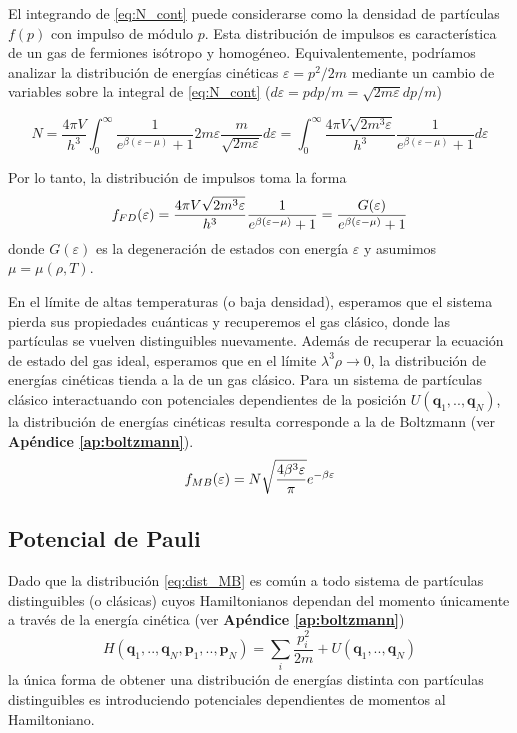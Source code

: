 El integrando de \eqref{eq:N_cont} puede considerarse como la densidad de partículas $f(p)$ con impulso de módulo $p$.
Esta distribución de impulsos es característica de un gas de fermiones isótropo y homogéneo.
Equivalentemente, podríamos analizar la distribución de energías cinéticas $\varepsilon=p^2/2m$ mediante un cambio de variables sobre la integral de \eqref{eq:N_cont}
($d\varepsilon = pdp/m = \sqrt{2m\varepsilon}dp/m$)

\[ N = \frac{4\pi V}{h^3} \int_0^\infty \frac{1}{e^{\beta(\varepsilon-\mu)}+1} 2m\varepsilon\frac{m}{\sqrt{2m\varepsilon}}d\varepsilon =
\int_0^\infty \frac{4\pi V\sqrt{2m^3\varepsilon}}{h^3}\frac{1}{e^{\beta(\varepsilon-\mu)}+1} d\varepsilon\]

Por lo tanto, la distribución de impulsos toma la forma
\begin{equation}{\label{eq:dist_FD}}
 f_{FD}(\varepsilon) = \frac{4\pi V \sqrt{2m^3\varepsilon}}{h^3}\frac{1}{e^{\beta(\varepsilon-\mu)}+1} = \frac{G(\varepsilon)}{e^{\beta(\varepsilon-\mu)}+1}
\end{equation}
donde $G(\varepsilon)$ es la degeneración de estados con energía $\varepsilon$ y asumimos $\mu=\mu(\rho,T)$.

En el límite de altas temperaturas (o baja densidad), esperamos que el sistema pierda sus propiedades cuánticas y recuperemos el gas clásico, donde las partículas
se vuelven distinguibles nuevamente.
Además de recuperar la ecuación de estado del gas ideal, esperamos que en el límite $\lambda^3\rho\to0$, la distribución de energías cinéticas tienda a la de un gas clásico.
Para un sistema de partículas clásico interactuando con potenciales dependientes de la posición $U(\mathbf{q}_1,..,\mathbf{q}_N)$, la distribución de energías cinéticas resulta
corresponde a la de Boltzmann (ver \textbf{Apéndice \ref{ap:boltzmann}}).
\begin{equation}{\label{eq:dist_MB}}
 f_{MB}(\varepsilon) = N\sqrt{\frac{4\beta^3\varepsilon}{\pi}}e^{-\beta\varepsilon}
\end{equation}



\subsection{Potencial de Pauli}{\label{sec:intro_pauli}}

Dado que la distribución \eqref{eq:dist_MB} es común a todo sistema de partículas distinguibles (o clásicas) cuyos Hamiltonianos dependan del momento únicamente
a través de la energía cinética (ver  \textbf{Apéndice \ref{ap:boltzmann}})
\[ H(\mathbf{q}_1,..,\mathbf{q}_N,\mathbf{p}_1,..,\mathbf{p}_N) = \sum_i \frac{p_i^2}{2m} + U(\mathbf{q}_1,..,\mathbf{q}_N)\]
la única forma de obtener una distribución de energías distinta con partículas distinguibles es introduciendo potenciales dependientes de momentos al Hamiltoniano.

